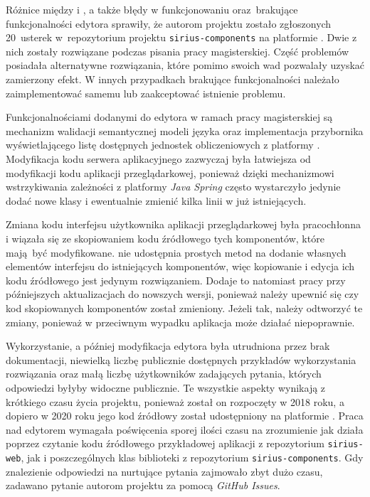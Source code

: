 Różnice między \SiriusWeb{} i \SiriusDesktop{}, a także błędy w
funkcjonowaniu oraz~brakujące funkcjonalności edytora sprawiły, że autorom
projektu zostało zgłoszonych 20~usterek w~repozytorium projektu
\texttt{sirius-components} na platformie \GitHub{}. Dwie z nich zostały
rozwiązane podczas pisania pracy magisterskiej. Część problemów posiadała
alternatywne rozwiązania, które pomimo swoich wad pozwalały uzyskać zamierzony
efekt. W innych przypadkach brakujące funkcjonalności należało zaimplementować
samemu lub zaakceptować istnienie problemu.

Funkcjonalnościami dodanymi do edytora w ramach pracy magisterskiej są
mechanizm walidacji semantycznej modeli języka \CAL{} oraz implementacja
przybornika wyświetlającego listę dostępnych jednostek obliczeniowych z
platformy
\BalticLSC{}. Modyfikacja kodu serwera aplikacyjnego zazwyczaj była
łatwiejsza od modyfikacji kodu aplikacji przeglądarkowej, ponieważ dzięki
mechanizmowi wstrzykiwania zależności z platformy \emph{Java Spring}
często wystarczyło jedynie dodać nowe klasy i ewentualnie zmienić kilka linii w
już istniejących.

Zmiana kodu interfejsu użytkownika aplikacji przeglądarkowej była pracochłonna
i wiązała się ze skopiowaniem kodu źródłowego tych komponentów, które mają być
modyfikowane. \SiriusWeb{} nie udostępnia prostych metod na dodanie
własnych elementów interfejsu do istniejących komponentów, więc kopiowanie i
edycja ich kodu źródłowego jest jedynym rozwiązaniem. Dodaje to natomiast pracy
przy późniejszych aktualizacjach do nowszych wersji, ponieważ należy upewnić
się
czy kod skopiowanych komponentów został zmieniony. Jeżeli tak, należy odtworzyć
te zmiany, ponieważ w przeciwnym wypadku aplikacja może działać niepoprawnie.

Wykorzystanie, a później modyfikacja edytora \SiriusWeb{} była utrudniona
przez brak dokumentacji, niewielką liczbę publicznie dostępnych przykładów
wykorzystania rozwiązania oraz małą liczbę użytkowników zadających pytania,
których odpowiedzi byłyby widoczne publicznie. Te wszystkie aspekty wynikają z
krótkiego czasu życia projektu, ponieważ został on rozpoczęty w 2018 roku, a
dopiero w 2020 roku jego kod źródłowy został udostępniony na platformie
\GitHub{}. Praca nad edytorem wymagała poświęcenia sporej ilości czasu na
zrozumienie jak \SiriusWeb{} działa poprzez czytanie kodu źródłowego
przykładowej aplikacji z repozytorium \texttt{sirius-web}, jak i poszczególnych
klas biblioteki z repozytorium \texttt{sirius-components}. Gdy znalezienie
odpowiedzi na nurtujące pytania zajmowało zbyt dużo czasu, zadawano pytanie
autorom projektu za pomocą \emph{GitHub Issues}.

